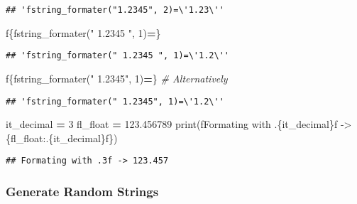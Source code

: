 \documentclass[
]{book}
\newenvironment{Shaded}{\begin{snugshade}}{\end{snugshade}}
\newcommand{\BuiltInTok}[1]{#1}
\newcommand{\CommentTok}[1]{\textcolor[rgb]{0.56,0.35,0.01}{\textit{#1}}}
\newcommand{\DecValTok}[1]{\textcolor[rgb]{0.00,0.00,0.81}{#1}}
\newcommand{\FloatTok}[1]{\textcolor[rgb]{0.00,0.00,0.81}{#1}}
\newcommand{\NormalTok}[1]{#1}
\newcommand{\OperatorTok}[1]{\textcolor[rgb]{0.81,0.36,0.00}{\textbf{#1}}}
\newcommand{\SpecialCharTok}[1]{\textcolor[rgb]{0.00,0.00,0.00}{#1}}
\newcommand{\SpecialStringTok}[1]{\textcolor[rgb]{0.31,0.60,0.02}{#1}}
\newcommand{\StringTok}[1]{\textcolor[rgb]{0.31,0.60,0.02}{#1}}
\begin{document}
\begin{verbatim}
## 'fstring_formater("1.2345", 2)=\'1.23\''
\end{verbatim}

\begin{Shaded}
\begin{Highlighting}[]
\SpecialStringTok{f\textquotesingle{}}\SpecialCharTok{\{}\NormalTok{fstring\_formater(}\StringTok{" 1.2345 "}\NormalTok{, }\DecValTok{1}\NormalTok{)}\OperatorTok{=}\SpecialCharTok{\}}\SpecialStringTok{\textquotesingle{}}
\end{Highlighting}
\end{Shaded}

\begin{verbatim}
## 'fstring_formater(" 1.2345 ", 1)=\'1.2\''
\end{verbatim}

\begin{Shaded}
\begin{Highlighting}[]
\SpecialStringTok{f\textquotesingle{}}\SpecialCharTok{\{}\NormalTok{fstring\_formater(}\StringTok{" 1.2345"}\NormalTok{, }\DecValTok{1}\NormalTok{)}\OperatorTok{=}\SpecialCharTok{\}}\SpecialStringTok{\textquotesingle{}}
\CommentTok{\# Alternatively}
\end{Highlighting}
\end{Shaded}

\begin{verbatim}
## 'fstring_formater(" 1.2345", 1)=\'1.2\''
\end{verbatim}

\begin{Shaded}
\begin{Highlighting}[]
\NormalTok{it\_decimal }\OperatorTok{=} \DecValTok{3}
\NormalTok{fl\_float }\OperatorTok{=} \FloatTok{123.456789}
\BuiltInTok{print}\NormalTok{(}\SpecialStringTok{f\textquotesingle{}Formating with .}\SpecialCharTok{\{}\NormalTok{it\_decimal}\SpecialCharTok{\}}\SpecialStringTok{f {-}\textgreater{} }\SpecialCharTok{\{}\NormalTok{fl\_float}\SpecialCharTok{:.}\NormalTok{\{it\_decimal\}}\SpecialCharTok{f\}}\SpecialStringTok{\textquotesingle{}}\NormalTok{)}
\end{Highlighting}
\end{Shaded}

\begin{verbatim}
## Formating with .3f -> 123.457
\end{verbatim}

\hypertarget{generate-random-strings}{%
\subsubsection{Generate Random Strings}\label{generate-random-strings}}
\end{document}
